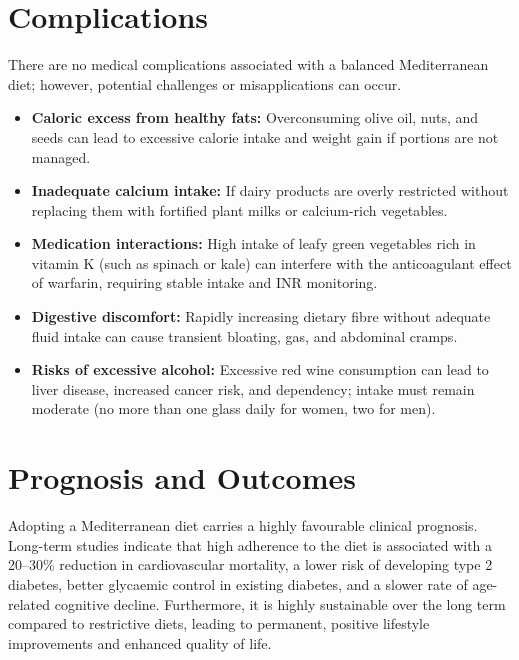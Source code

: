 \section*{Complications}
There are no medical complications associated with a balanced Mediterranean diet; however, potential challenges or misapplications can occur.
\begin{itemize}
    \item \textbf{Caloric excess from healthy fats:} Overconsuming olive oil, nuts, and seeds can lead to excessive calorie intake and weight gain if portions are not managed.
    \item \textbf{Inadequate calcium intake:} If dairy products are overly restricted without replacing them with fortified plant milks or calcium-rich vegetables.
    \item \textbf{Medication interactions:} High intake of leafy green vegetables rich in vitamin K (such as spinach or kale) can interfere with the anticoagulant effect of warfarin, requiring stable intake and INR monitoring.
    \item \textbf{Digestive discomfort:} Rapidly increasing dietary fibre without adequate fluid intake can cause transient bloating, gas, and abdominal cramps.
    \item \textbf{Risks of excessive alcohol:} Excessive red wine consumption can lead to liver disease, increased cancer risk, and dependency; intake must remain moderate (no more than one glass daily for women, two for men).
\end{itemize}

\section*{Prognosis and Outcomes}
Adopting a Mediterranean diet carries a highly favourable clinical prognosis. Long-term studies indicate that high adherence to the diet is associated with a 20--30\% reduction in cardiovascular mortality, a lower risk of developing type 2 diabetes, better glycaemic control in existing diabetes, and a slower rate of age-related cognitive decline. Furthermore, it is highly sustainable over the long term compared to restrictive diets, leading to permanent, positive lifestyle improvements and enhanced quality of life.

